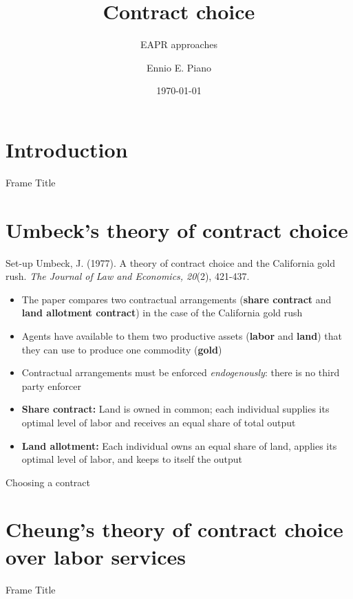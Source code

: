 \documentclass[10pt]{beamer}
\title[Contract choice]{Contract choice}
\subtitle{EAPR approaches}
\author[Piano]{Ennio E. Piano}
\institute[MTSU \& PERI]{MTSU \& PERI} %
\date[\today]{\today}
\begin{document}
\begin{frame}
\titlepage

\end{frame}

\section{Introduction}
\begin{frame}{Frame Title}
    
\end{frame}

\section{Umbeck's theory of contract choice}
\begin{frame}{Set-up}
Umbeck, J. (1977). A theory of contract choice and the California gold rush. \textit{The Journal of Law and Economics, 20}(2), 421-437.
\begin{itemize}
    \item The paper compares two contractual arrangements (\textbf{share contract} and \textbf{land allotment contract}) in the case of the California gold rush
    \item Agents have available to them two productive assets (\textbf{labor} and \textbf{land}) that they can use to produce one commodity (\textbf{gold})
    \item Contractual arrangements must be enforced \textit{endogenously}: there is no third party enforcer
    \item \textbf{Share contract:} Land is owned in common; each individual supplies its optimal level of labor and receives an equal share of total output
    \item \textbf{Land allotment:} Each individual owns an equal share of land, applies its optimal level of labor, and keeps to itself the output
\end{itemize}
\end{frame}

\begin{frame}{Choosing a contract}
    
\end{frame}

\section{Cheung's theory of contract choice over labor services}
\begin{frame}{Frame Title}
    
\end{frame}
\end{document}
